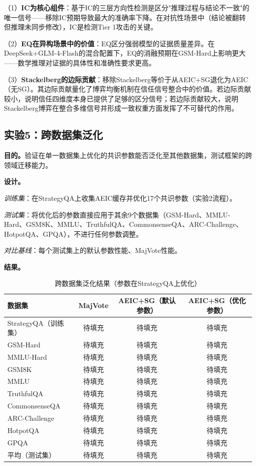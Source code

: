 \documentclass[12pt,a4paper,UTF8,fontset=fandol]{ctexart}
\begin{document}
（1）\textbf{IC为核心组件}：基于IC的三层方向性检测是区分"推理过程与结论不一致"的唯一信号——移除IC预期导致最大的准确率下降。在对抗性场景中（结论被翻转但推理未同步修改），IC是检测Tier 1攻击的关键。

（2）\textbf{EQ在异构场景中的价值}：EQ区分强弱模型的证据质量差异。在DeepSeek+GLM-4-Flash的混合配置下，EQ的消融预期在GSM-Hard上影响更大——数学推理对证据的具体性和准确性要求更高。

（3）\textbf{Stackelberg的边际贡献}：移除Stackelberg等价于从AEIC+SG退化为AEIC（无SG）。其边际贡献量化了博弈均衡机制在信任信号整合中的价值。若边际贡献较小，说明信任四维度本身已提供了足够的区分信号；若边际贡献较大，说明Stackelberg博弈在整合多维信号并形成一致权重方面发挥了不可替代的作用。

\subsection{实验5：跨数据集泛化}\label{sec:exp5}

\textbf{目的。}验证在单一数据集上优化的共识参数能否泛化至其他数据集，测试框架的跨领域迁移能力。

\textbf{设计。}

\textit{训练集}：在StrategyQA上收集AEIC缓存并优化17个共识参数（实验2流程）。

\textit{测试集}：将优化后的参数直接应用于其余9个数据集（GSM-Hard、MMLU-Hard、GSM8K、MMLU、TruthfulQA、CommonsenseQA、ARC-Challenge、HotpotQA、GPQA），不进行任何参数调整。

\textit{对比基线}：每个测试集上的默认参数性能、MajVote性能。

\textbf{结果。}

\begin{table}[H]
\centering
\caption{跨数据集泛化结果（参数在StrategyQA上优化）}\label{tab:exp5_result}
\begin{tabular}{lccc}
\toprule
数据集 & MajVote & AEIC+SG（默认参数） & AEIC+SG（优化参数） \\
\midrule
StrategyQA（训练集） & 待填充 & 待填充 & 待填充 \\
\midrule
GSM-Hard & 待填充 & 待填充 & 待填充 \\
MMLU-Hard & 待填充 & 待填充 & 待填充 \\
GSM8K & 待填充 & 待填充 & 待填充 \\
MMLU & 待填充 & 待填充 & 待填充 \\
TruthfulQA & 待填充 & 待填充 & 待填充 \\
CommonsenseQA & 待填充 & 待填充 & 待填充 \\
ARC-Challenge & 待填充 & 待填充 & 待填充 \\
HotpotQA & 待填充 & 待填充 & 待填充 \\
GPQA & 待填充 & 待填充 & 待填充 \\
\midrule
平均（测试集） & 待填充 & 待填充 & 待填充 \\
\bottomrule
\end{tabular}
\end{table}
\end{document}
